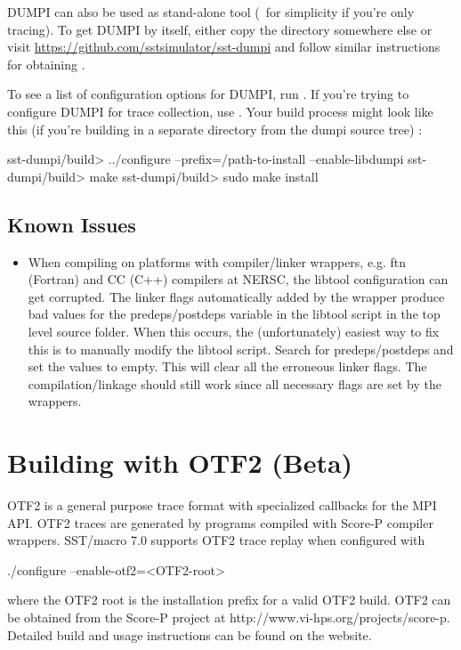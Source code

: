 DUMPI can also be used as stand-alone tool (\eg~for simplicity if you're only tracing). 
To get DUMPI by itself, either copy the  directory somewhere else or visit \url{https://github.com/sstsimulator/sst-dumpi} and follow similar instructions for obtaining \sstmacro.

To see a list of configuration options for DUMPI, run .  
If you're trying to configure DUMPI for trace collection, use .
Your build process might look like this (if you're building in a separate directory from the dumpi source tree) :

\begin{ShellCmd}
sst-dumpi/build> ../configure --prefix=/path-to-install --enable-libdumpi
sst-dumpi/build> make
sst-dumpi/build> sudo make install
\end{ShellCmd}

\subsection{Known Issues}
\label{subsubsec:building:dumpi:issues}

\begin{itemize}
\item When compiling on platforms with compiler/linker wrappers, e.g. ftn (Fortran) and CC (C++) compilers 
at NERSC, the libtool configuration can get corrupted.  The linker flags automatically added by the 
wrapper produce bad values for the predeps/postdeps variable in the libtool script in the top 
level source folder.  When this occurs, the (unfortunately) easiest way to fix this is to manually modify
the libtool script.  Search for predeps/postdeps and set the values to empty.
This will clear all the erroneous linker flags.  The compilation/linkage should still work since 
all necessary flags are set by the wrappers. 
\end{itemize}

\section{Building with OTF2 (Beta)}
\label{sec:buildingOtf2}
OTF2 is a general purpose trace format with specialized callbacks for the MPI API. OTF2 traces are generated by programs compiled with Score-P compiler wrappers. SST/macro 7.0 supports OTF2 trace replay when configured with 

\begin{ViFile}
./configure --enable-otf2=<OTF2-root>	
\end{ViFile}
where the OTF2 root is the installation prefix for a valid OTF2 build. OTF2 can be obtained from the Score-P project at {http://www.vi-hps.org/projects/score-p}.
Detailed build and usage instructions can be found on the website.


